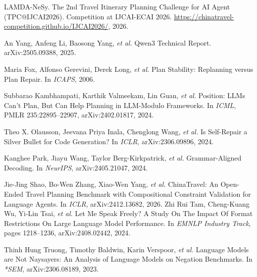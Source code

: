 \documentclass{article}
\begin{document}
\begin{thebibliography}{}
\small
\setlength{\itemsep}{0pt plus 0.2pt}
LAMDA-NeSy.
\newblock The 2nd Travel Itinerary Planning Challenge for AI Agent
(TPC@IJCAI2026).
\newblock Competition at IJCAI-ECAI 2026.
\url{https://chinatravel-competition.github.io/IJCAI2026/}, 2026.
 
An Yang, Anfeng Li, Baosong Yang, \emph{et al.}
\newblock Qwen3 Technical Report.
\newblock arXiv:2505.09388, 2025.
 
Maria Fox, Alfonso Gerevini, Derek Long, \emph{et al.}
\newblock Plan Stability: Replanning versus Plan Repair.
\newblock In \emph{ICAPS}, 2006.

Subbarao Kambhampati, Karthik Valmeekam, Lin Guan, \emph{et al.}
\newblock Position: LLMs Can't Plan, But Can Help Planning in LLM-Modulo
Frameworks.
\newblock In \emph{ICML}, PMLR 235:22895--22907, arXiv:2402.01817, 2024.

Theo X. Olausson, Jeevana Priya Inala, Chenglong Wang, \emph{et al.}
\newblock Is Self-Repair a Silver Bullet for Code Generation?
\newblock In \emph{ICLR}, arXiv:2306.09896, 2024.

Kanghee Park, Jiayu Wang, Taylor Berg-Kirkpatrick, \emph{et al.}
\newblock Grammar-Aligned Decoding.
\newblock In \emph{NeurIPS}, arXiv:2405.21047, 2024.

Jie-Jing Shao, Bo-Wen Zhang, Xiao-Wen Yang, \emph{et al.}
\newblock ChinaTravel: An Open-Ended Travel Planning Benchmark with
Compositional Constraint Validation for Language Agents.
\newblock In \emph{ICLR}, arXiv:2412.13682, 2026.
Zhi Rui Tam, Cheng-Kuang Wu, Yi-Lin Tsai, \emph{et al.}
\newblock Let Me Speak Freely? A Study On The Impact Of Format Restrictions
On Large Language Model Performance.
\newblock In \emph{EMNLP Industry Track}, pages 1218--1236, arXiv:2408.02442,
2024.

Thinh Hung Truong, Timothy Baldwin, Karin Verspoor, \emph{et al.}
\newblock Language Models are Not Naysayers: An Analysis of Language Models
on Negation Benchmarks.
\newblock In \emph{*SEM}, arXiv:2306.08189, 2023.

\end{thebibliography}
\end{document}
